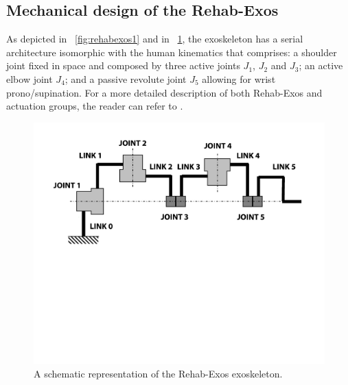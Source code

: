 \documentclass[journal]{IEEEtran}
\newcommand{\hldone}[1]{\colorbox{green}{#1}}
\begin{document}
\subsection{Mechanical design of the Rehab-Exos} 
\label{subsec:mechanicalDesign}
As depicted in \figurename \ \ref{fig:rehabexos1} and in \figurename \ \ref{fig:rehabexosSchema}, the exoskeleton has a serial architecture isomorphic with the human kinematics that comprises: a shoulder joint  fixed in space and composed by three active joints $J_1$, $J_2$ and $J_3$; an active elbow joint $J_4$; and a passive revolute joint $J_5$ allowing for wrist prono/supination.  For a more detailed description of both Rehab-Exos and actuation groups, the reader can refer to \cite{vertechy2009development}.
\begin{figure}[]
	\centering
	\includegraphics[width=0.9\columnwidth]{SchemaExos}
	\caption{A schematic representation of the Rehab-Exos exoskeleton.}
	\label{fig:rehabexosSchema}
\end{figure}
%
%
\end{document}

